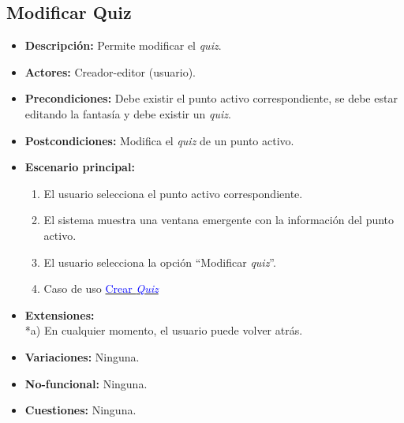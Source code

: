 \documentclass[12pt,letterpaper]{article}
\begin{document}
\subsection{Modificar Quiz}
\begin{itemize}
	\item \textbf{Descripción:} Permite modificar el \textit{quiz}.
	\item \textbf{Actores:} Creador-editor (usuario).
	\item \textbf{Precondiciones:} Debe existir el punto activo correspondiente, se debe estar editando la fantasía y debe existir un \textit{quiz}.
	\item \textbf{Postcondiciones:} Modifica el \textit{quiz} de un punto activo.
	\item \textbf{Escenario principal:}
	\begin{enumerate}
		\item El usuario selecciona el punto activo correspondiente.
		\item El sistema muestra una ventana emergente con la información del punto activo.
		\item El usuario selecciona la opción ``Modificar \textit{quiz}''.
		\item Caso de uso \hyperlink{crearquiz}{\textcolor{blue}{Crear \textit{Quiz}}}
	\end{enumerate}
	\item \textbf{Extensiones:} \\ *a) En cualquier momento, el usuario puede volver atrás.
	\item \textbf{Variaciones:} Ninguna.
	\item \textbf{No-funcional:} Ninguna.
	\item \textbf{Cuestiones:} Ninguna.
\end{itemize}
\end{document}
